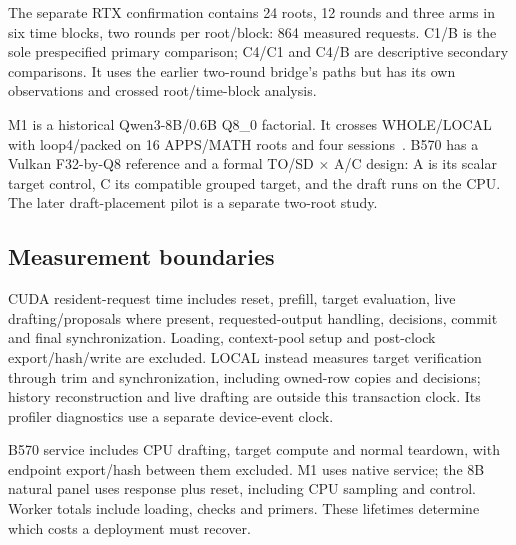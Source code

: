 The separate RTX confirmation contains 24 roots, 12 rounds and three arms in six time blocks, two rounds per root/block: 864 measured requests. C1/B is the sole prespecified primary comparison; C4/C1 and C4/B are descriptive secondary comparisons. It uses the earlier two-round bridge's paths but has its own observations and crossed root/time-block analysis.

M1 is a historical Qwen3-8B/0.6B Q8\_0 factorial. It crosses WHOLE/LOCAL with loop4/packed on 16 APPS/MATH roots and four sessions~\cite{apps,math}. B570 has a Vulkan F32-by-Q8 reference and a formal TO/SD $\times$ A/C design: A is its scalar target control, C its compatible grouped target, and the draft runs on the CPU. The later draft-placement pilot is a separate two-root study.


\subsection{Measurement boundaries}
CUDA resident-request time includes reset, prefill, target evaluation, live drafting/proposals where present, requested-output handling, decisions, commit and final synchronization. Loading, context-pool setup and post-clock export/hash/write are excluded. LOCAL instead measures target verification through trim and synchronization, including owned-row copies and decisions; history reconstruction and live drafting are outside this transaction clock. Its profiler diagnostics use a separate device-event clock.

B570 service includes CPU drafting, target compute and normal teardown, with endpoint export/hash between them excluded. M1 uses native service; the 8B natural panel uses response plus reset, including CPU sampling and control. Worker totals include loading, checks and primers. These lifetimes determine which costs a deployment must recover.

